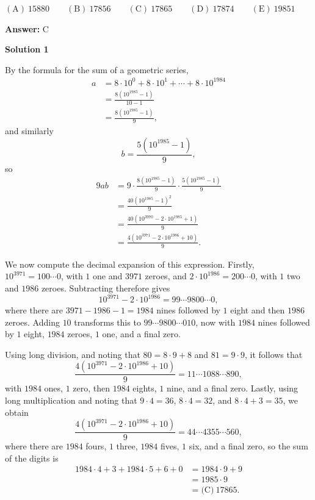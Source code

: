 \begin{enumerate}
 $\mathrm{(A)\ } 15880 \qquad \mathrm{(B) \ }17856 \qquad \mathrm{(C) \  } 17865 \qquad \mathrm{(D) \  } 17874 \qquad \mathrm{(E) \  }19851$

 \textbf{Answer: }C



\textbf{Solution 1}

By the formula for the sum of a geometric series, 
 \begin{align*}a &= 8 \cdot 10^0 + 8 \cdot 10^1 + \dotsb + 8 \cdot 10^{1984} \\ &= \frac{8\left(10^{1985}-1\right)}{10-1} \\ &= \frac{8\left(10^{1985}-1\right)}{9},\end{align*}
 and similarly 
 \[b = \frac{5\left(10^{1985}-1\right)}{9},\] so 
 \begin{align*}9ab &= 9\cdot\frac{8\left(10^{1985}-1\right)}{9}\cdot\frac{5\left(10^{1985}-1\right)}{9} \\ &= \frac{40\left(10^{1985}-1\right)^2}{9} \\ &= \frac{40\left(10^{3970}-2 \cdot 10^{1985}+1\right)}{9} \\ &= \frac{4\left(10^{3971}-2 \cdot 10^{1986}+10\right)}{9}.\end{align*}


 We now compute the decimal expansion of this expression. Firstly, $10^{3971} = 100 \dotsb 0$, with $1$ one and $3971$ zeroes, and $2 \cdot 10^{1986} = 200 \dotsb 0$, with $1$ two and $1986$ zeroes. Subtracting therefore gives 
 \[10^{3971}-2 \cdot 10^{1986} = 99 \dotsb 9800 \dotsb 0,\] where there are $3971-1986-1 = 1984$ nines followed by $1$ eight and then $1986$ zeroes. Adding $10$ transforms this to $99 \dotsb 9800 \dotsb 010$, now with $1984$ nines followed by $1$ eight, $1984$ zeroes, $1$ one, and a final zero.

 Using long division, and noting that $80 = 8 \cdot 9 + 8$ and $81 = 9 \cdot 9$, it follows that 
 \[\frac{4\left(10^{3971}-2 \cdot 10^{1986}+10\right)}{9} = 11 \dotsb 1088 \dotsb 890,\] with $1984$ ones, $1$ zero, then $1984$ eights, $1$ nine, and a final zero. Lastly, using long multiplication and noting that $9 \cdot 4 = 36$, $8 \cdot 4 = 32$, and $8 \cdot 4 + 3 = 35$, we obtain 
 \[\frac{4\left(10^{3971}-2 \cdot 10^{1986}+10\right)}{9} = 44 \dotsb 4355 \dotsb 560,\] where there are $1984$ fours, $1$ three, $1984$ fives, $1$ six, and a final zero, so the sum of the digits is 
 \begin{align*}1984 \cdot 4 + 3 + 1984 \cdot 5 + 6 + 0 &= 1984 \cdot 9 + 9 \\ &= 1985 \cdot 9 \\ &= \boxed{\text{(C)} \ 17865}.\end{align*}






\end{enumerate}
